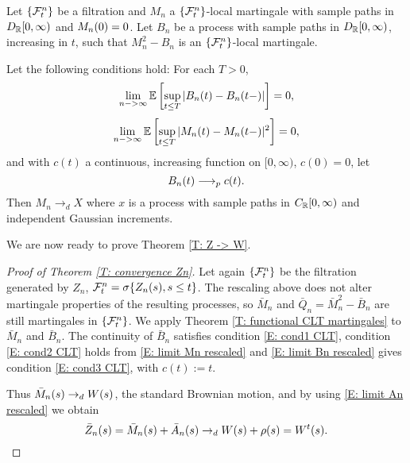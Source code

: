 \begin{theorem} \label{T: functional CLT martingales}
	Let $\{\mathcal{F}^n_{t}\}$ be a filtration and $M_n$ a $\{\mathcal{F}^n_{t}\}$-local martingale with sample paths in $D_{\mathbb{R}}[0,\infty)$ and $M_n(0)=0$.
	Let $B_n$ be a process with sample paths in $D_{\mathbb{R}}[0,\infty)$, increasing in $t$, such that $M_n^2 - B_n$ is an $\{\mathcal{F}^n_{t}\}$-local martingale.
	
	Let the following conditions hold:
	For each $T>0$,
	\begin{equation} \label{E: cond1 CLT}
	\lim_{n->\infty} \mathbb{E} \left[ 
	\sup_{t \leq T} | B_n(t) - B_n(t-)|
     \right] = 0,
	\end{equation}
	\begin{equation} \label{E: cond2 CLT}
	\lim_{n->\infty} \mathbb{E} \left[ 
		\sup_{t \leq T} | M_n(t) - M_n(t-)|^2
	 \right] = 0,
	\end{equation}
	and with $c(t)$ a continuous, increasing function on $[0, \infty)$, $c(0) = 0$, let
	\begin{equation} \label{E: cond3 CLT}
	B_n(t) \longrightarrow_p c(t).
	\end{equation}
	Then $M_n \longrightarrow_d X$ where $x$ is a process with sample paths in $C_{\mathbb{R}}[0,\infty)$ and independent Gaussian increments.
\end{theorem}


We are now ready to prove Theorem \ref{T: Z -> W}.

\begin{proof}[Proof of Theorem \ref{T: convergence Zn}]
	Let again $\{\mathcal{F}^n_{t}\}$ be the filtration generated by $Z_n$, 
	$\mathcal{F}^n_{t} = \sigma \{ Z_n(s), s \leq t \}$.
	The rescaling above does not alter martingale properties of the resulting processes,
	so $\bar{M}_n$ and $\bar{Q}_n = \bar{M}_n^2 - \bar{B}_n$ are still martingales in $\{\mathcal{F}^n_{t}\}$.
	We apply Theorem \ref{T: functional CLT martingales} to $\bar{M}_n$ and $\bar{B}_n$.
	The continuity of $\bar{B}_n$ satisfies condition \ref{E: cond1 CLT}, 
	condition \ref{E: cond2 CLT} holds from \ref{E: limit Mn rescaled}
	and \ref{E: limit Bn rescaled} gives condition \ref{E: cond3 CLT}, with $c(t) := t$.
	
	Thus $\bar{M}_n(s) \rightarrow_d W(s)$, the standard Brownian motion, and by using \ref{E: limit An rescaled} we obtain
	\begin{equation*}
	\bar{Z}_n(s) = \bar{M}_n(s) + \bar{A}_n(s) \rightarrow_d W(s) + \rho (s) = W^t(s).
	\end{equation*}
			
\end{proof}

